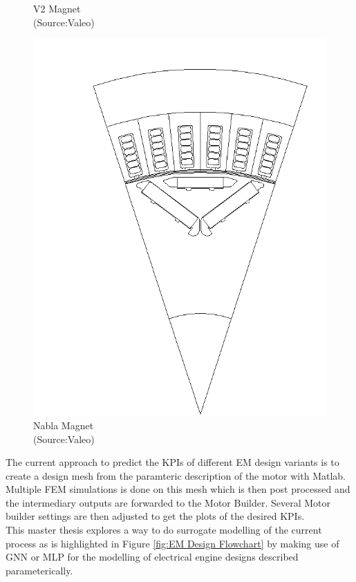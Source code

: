 \documentclass{report} %
\begin{document}
\begin{figure}[H]
\begin{minipage}[b]{0.325\textwidth}
        \caption{\centering V2 Magnet\\ (Source:Valeo)}
        \label{fig:V2 Magnet}
    \end{minipage}
    \hfill
    \begin{minipage}[b]{0.325\textwidth}
        \centering
        \includegraphics[width=\textwidth]{./ReportImages/Nabla_Magnet.png}
        \caption{\centering Nabla Magnet\\ (Source:Valeo)}
        \label{fig:Nabla Magnet}
    \end{minipage}
\end{figure}
The current approach to predict the \ac{KPI}s of different \ac{EM} design variants is to create a design mesh from the paramteric description of the motor with Matlab.
Multiple FEM simulations is done on this mesh which is then post processed and the intermediary outputs are forwarded to the Motor Builder.
Several Motor builder settings are then adjusted to get the plots of the desired \ac{KPI}s.\\
This master thesis explores a way to do surrogate modelling of the current process as is highlighted in Figure \ref{fig:EM Design Flowchart} by making use of \ac{GNN} or \ac{MLP} for the modelling of electrical engine designs described parameterically. \\
\end{document}
